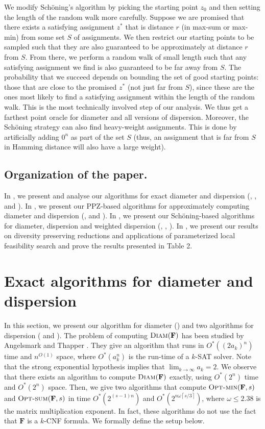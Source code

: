 \documentclass[11pt, letterpaper]{article}
\theoremstyle{definition}
\newcommand{\f}{\mathbf{F}}
\newcommand{\opts}{\textsc{Opt-sum}}
\newcommand{\optm}{\textsc{Opt-min}}
\newcommand{\D}{\textsc{Diam}}
\newcommand{\sch}{Sch\"{o}ning\xspace}
\newcommand{\ceil}[1]{{\left\lceil{#1}\right\rceil}}
\begin{document}
We modify \sch's algorithm by picking the starting point $z_0$ and then setting the length of the random walk more carefully. Suppose we are promised that there exists a satisfying assignment $z^*$ that is distance $r$ (in max-sum or max-min) from some set $S$ of assignments. We then restrict our starting points to be sampled such that they are also guaranteed to be approximately at distance $r$ from $S$. From there, we perform a random walk of small length such that any satisfying assignment we find is also guaranteed to be far away from $S$. The probability that we succeed depends on bounding the set of good starting points: those that are close to the promised $z^*$ (not just far from $S$), since these are the ones most likely to find a satisfying assignment within the length of the random walk. This is the most technically involved step of our analysis. We thus get a farthest point oracle for diameter and all versions of dispersion. Moreover, the \sch strategy can also find heavy-weight assignments. This is done by artificially adding $0^n$ as part of the set $S$ (thus, an assignment that is far from $S$ in Hamming distance will also have a large weight). 
 
\subsection{Organization of the paper.}
In , we present and analyse our algorithms for exact diameter and dispersion (, , and ). In , we present our PPZ-based algorithms for approximately computing diameter and dispersion (,  and ). In , we present our \sch-based algorithms for diameter, dispersion and weighted dispersion (, , ). In , we present our results on diversity preserving reductions and applications of parameterized local feasibility search and prove the results presented in Table 2. 
 \section{Exact algorithms for diameter and dispersion}
\label{sec:exact}
In this section, we present our algorithm for diameter () and two algorithms for dispersion ( and ). The problem of computing $\D(\f)$ has been studied by Angelsmark and Thapper \cite{angelsmark2004algorithms}. They give an algorithm that runs in $O^*((2a_k)^n)$ time and $n^{O(1)}$ space, where $O^*(a_k^n)$ is the run-time of a $k$-SAT solver. Note that the strong exponential hypothesis implies that $\lim_{k \to \infty} a_k=2$. We observe that there exists an algorithm to compute $\D(\f)$ exactly, using $O^*(2^n)$ time and $O^*(2^n)$ space. Then, we give two algorithms that compute $\optm(\f,s)$ and $\opts(\f,s)$ in time $O^*(2^{(s-1)n})$ and $O^*(2^{n\omega\ceil{ s/3}})$, where $\omega \leq 2.38$ is the matrix multiplication exponent. In fact, these algorithms do not use the fact that $\f$ is a $k$-CNF formula. We formally define the setup below. 
\end{document}
